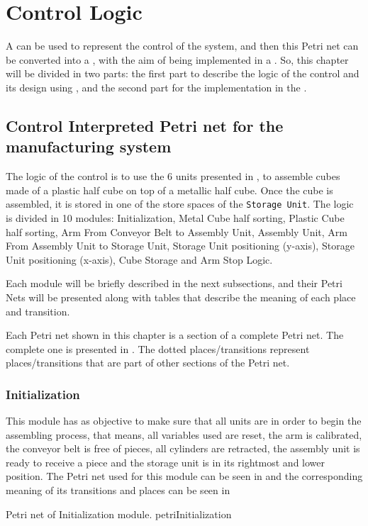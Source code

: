 
\chapter{Control Logic}
\label{cha:control}
A \CIPN{} can be used to
represent the control of the system, and then this Petri net can be converted
into a \LD, with the aim of being implemented in a \PLC. So, this chapter will be
divided in two parts: the first part to describe the logic of the control and
its design using \CIPN, and the second part for the implementation in the \PLC.
\section{Control Interpreted Petri net for the manufacturing system}
\label{sec:logic}
The logic of the control is to use the 6 units presented in
, to assemble cubes made of a plastic half cube on top of a
metallic half cube. Once the cube is assembled, it is stored in one of
the store spaces of the \verb|Storage Unit|. 
The logic is divided in 10 modules:
 Initialization, Metal Cube half sorting, Plastic Cube half sorting, Arm From
 Conveyor Belt to Assembly Unit, Assembly Unit, Arm From Assembly Unit to
 Storage Unit, Storage Unit positioning (y-axis), Storage Unit positioning (x-axis), Cube Storage and Arm Stop Logic.

Each module will be briefly described in the next subsections, and their Petri
Nets will be presented along with tables that describe the meaning of each place
and transition.

\begin{observation}
  Each Petri net shown in this chapter is a section of a complete Petri net.
 The complete one is presented in . The dotted
  places\slash transitions represent places\slash transitions that are part of
  other sections of the Petri net.
\end{observation}
\subsection{Initialization}
This module has as objective to make sure that all units are in order to begin
the assembling process, that means, all variables used are reset, the arm is
calibrated, the conveyor belt is free of pieces, all cylinders are retracted,
the assembly unit is ready to receive a piece and the storage unit is in its
rightmost and lower position. The Petri net used for this module can be seen in
 and the corresponding meaning of its
transitions and places can be seen in 


{Petri net of Initialization module.}
{petriInitialization}
